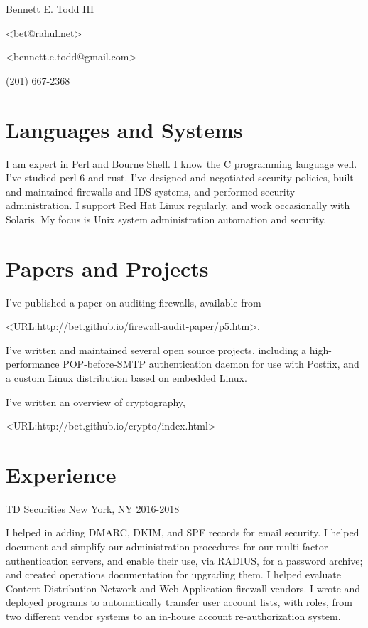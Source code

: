 \documentclass[12pt,letterpaper]{article}
\begin{document}
\frenchspacing

\begin{center}
Bennett E. Todd III

\textless bet@rahul.net\textgreater

\textless bennett.e.todd@gmail.com\textgreater

(201) 667-2368
\end{center}

\section*{Languages and Systems}

I am expert in Perl and Bourne Shell. I know the C programming
language well. I've studied perl 6 and rust. I've designed and
negotiated security policies, built and maintained firewalls and IDS
systems, and performed security administration. I support Red Hat
Linux regularly, and work occasionally with Solaris. My focus is
Unix system administration automation and security.

\section*{Papers and Projects}

I've published a paper on auditing firewalls, available from

\textless URL:http://bet.github.io/firewall-audit-paper/p5.htm\textgreater.

I've written and maintained several open source projects, including
a high-performance POP-before-SMTP authentication daemon for use
with Postfix, and a custom Linux distribution based on embedded
Linux.

I've written an overview of cryptography,

\textless URL:http://bet.github.io/crypto/index.html\textgreater

\section*{Experience}

TD Securities \hfill New York, NY
2016-2018

I helped in adding DMARC, DKIM, and SPF records for email security.
I helped document and simplify our administration procedures for
our multi-factor authentication servers, and enable their use, via
RADIUS, for a password archive; and created operations documentation
for upgrading them. I helped evaluate Content Distribution Network
and Web Application firewall vendors. I wrote and deployed programs
to automatically transfer user account lists, with roles, from two
different vendor systems to an in-house account re-authorization
system.
\\~
\end{document}
